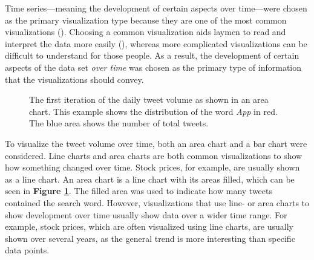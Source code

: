 Time series---meaning the development of certain aspects over time---were chosen as the primary visualization type because they are one of the most common visualizations (\cite{heerTourVisualizationZoo2010}). Choosing a common visualization aids laymen to read and interpret the data more easily (\cite{bornerInvestigatingAspectsData2016}), whereas more complicated visualizations can be difficult to understand for those people. As a result, the development of certain aspects of the data set \emph{over time} was chosen as the primary type of information that the visualizations should convey.

\begin{figure}[h!tb]
    \caption{The first iteration of the daily tweet volume as shown in an area chart. This example shows the distribution of the word \emph{App} in red. The blue area shows the number of total tweets.}
    \label{fig:volume_areachart}
\end{figure}

To visualize the tweet volume over time, both an area chart and a bar chart were considered. Line charts and area charts are both common visualizations to show how something changed over time. Stock prices, for example, are usually shown as a line chart. An area chart is a line chart with its areas filled, which can be seen in \textbf{Figure \ref{fig:volume_areachart}}. The filled area was used to indicate how many tweets contained the search word. However, visualizations that use line- or area charts to show development over time usually show data over a wider time range. For example, stock prices, which are often visualized using line charts, are usually shown over several years, as the general trend is more interesting than specific data points.

